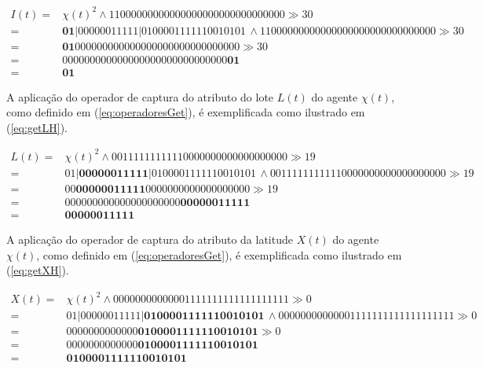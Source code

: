\begin{equation}
 \begin{split}
 I(t) = & \chi(t)^2 \wedge 11000000000000000000000000000000 \gg 30 \\
      = & \boldsymbol{0 1} | 0 0 0 0 0 0 1 1 1 1 1 | 0 1 0 0 0 0 1 1 1 1 1 1 0 0 1 0 1 0 1 \, \wedge 11000000000000000000000000000000 \gg 30 \\
      = & \boldsymbol{0 1} 0 0 0 0 0 0 0 0 0 0 0 0 0 0 0 0 0 0 0 0 0 0 0 0 0 0 0 0 0 0 \gg 30 \\
      = & 0 0 0 0 0 0 0 0 0 0 0 0 0 0 0 0 0 0 0 0 0 0 0 0 0 0 0 0 0 0 \boldsymbol{0 1} \\
      = & \boldsymbol{0 1}
 \label{eq:getIH}
 \end{split}
\end{equation}

A aplicação do operador de captura do atributo do lote $L(t)$ do agente $\chi(t)$, como definido em (\ref{eq:operadoresGet}), é exemplificada como ilustrado em (\ref{eq:getLH}).

\begin{equation}
 \begin{split}
 L(t) = & \chi(t)^2 \wedge 00111111111110000000000000000000 \gg 19 \\
      = & 0 1 | \boldsymbol{0 0 0 0 0 0 1 1 1 1 1} | 0 1 0 0 0 0 1 1 1 1 1 1 0 0 1 0 1 0 1 \, \wedge 00111111111110000000000000000000 \gg 19 \\
      = & 0 0 \boldsymbol{0 0 0 0 0 0 1 1 1 1 1} 0 0 0 0 0 0 0 0 0 0 0 0 0 0 0 0 0 0 0 \gg 19 \\
      = & 0 0 0 0 0 0 0 0 0 0 0 0 0 0 0 0 0 0 0 0 0 \boldsymbol{0 0 0 0 0 0 1 1 1 1 1} \\
      = & \boldsymbol{0 0 0 0 0 0 1 1 1 1 1}
 \label{eq:getLH}
 \end{split}
\end{equation}

A aplicação do operador de captura do atributo da latitude $X(t)$ do agente $\chi(t)$, como definido em (\ref{eq:operadoresGet}), é exemplificada como ilustrado em (\ref{eq:getXH}).

\begin{equation}
 \begin{split}
 X(t) = & \chi(t)^2 \wedge 00000000000001111111111111111111 \gg 0 \\
      = & 0 1 | 0 0 0 0 0 0 1 1 1 1 1 | \boldsymbol{0 1 0 0 0 0 1 1 1 1 1 1 0 0 1 0 1 0 1} \, \wedge 00000000000001111111111111111111 \gg 0 \\
      = & 0 0 0 0 0 0 0 0 0 0 0 0 0 \boldsymbol{0 1 0 0 0 0 1 1 1 1 1 1 0 0 1 0 1 0 1} \gg 0 \\
      = & 0 0 0 0 0 0 0 0 0 0 0 0 0 \boldsymbol{0 1 0 0 0 0 1 1 1 1 1 1 0 0 1 0 1 0 1} \\
      = & \boldsymbol{0 1 0 0 0 0 1 1 1 1 1 1 0 0 1 0 1 0 1}
 \label{eq:getXH}
 \end{split}
\end{equation}

